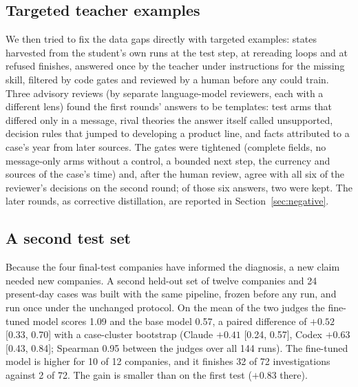 \subsection{Targeted teacher examples}
We then tried to fix the data gaps directly with targeted examples: states harvested from the student's own runs at the
test step, at rereading loops and at refused finishes, answered once by the teacher under instructions for the missing
skill, filtered by code gates and reviewed by a human before any could train. Three advisory reviews (by separate
language-model reviewers, each with a different lens) found the first rounds' answers to be templates: test
arms that differed only in a message, rival theories the answer itself called unsupported, decision rules that jumped to
developing a product line, and facts attributed to a case's year from later sources. The gates were tightened (complete
fields, no message-only arms without a control, a bounded next step, the currency and sources of the case's time) and,
after the human review, agree with all six of the reviewer's decisions on the second round; of those six answers, two were
kept. The later rounds, as corrective distillation, are reported in Section~\ref{sec:negative}.

\subsection{A second test set}
Because the four final-test companies have informed the diagnosis, a new claim needed new companies. A second held-out
set of twelve companies and 24 present-day cases was built with the same pipeline, frozen before any run, and run once
under the unchanged protocol. On the mean of the two judges the fine-tuned model scores 1.09 and the base model 0.57, a
paired difference of $+0.52$ [0.33, 0.70] with a case-cluster bootstrap (Claude $+0.41$ [0.24, 0.57], Codex $+0.63$
[0.43, 0.84]; Spearman 0.95 between the judges over all 144 runs). The fine-tuned model is higher for 10 of 12
companies, and it finishes 32 of 72 investigations against 2 of 72. The gain is smaller than on the first test
($+0.83$ there).

